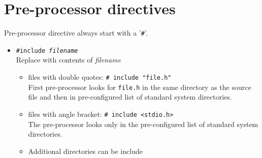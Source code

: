 \section{Pre-processor directives}

\begin{minipage}{\linewidth}
Pre-processor directive always start with a '\texttt{\#}'.

\begin{itemize}
    \item \texttt{\#include \textit{filename}}\\
    Replace with contents of \textit{filename}\\

    \begin{itemize}
        \item files with double quotes: \texttt{\# include "file.h"}\\
            First pre-processor looks for \texttt{file.h} in the same directory as the source file and then in pre-configured list of standard system directories.
        \item files with angle bracket: \texttt{\# include <stdio.h>}\\
            The pre-processor looks only in the pre-configured list of standard system directories.
        \item Additional directories can be include
    \end{itemize}
\end{itemize}

\begin{itemize}


\end{itemize}
\end{minipage}
